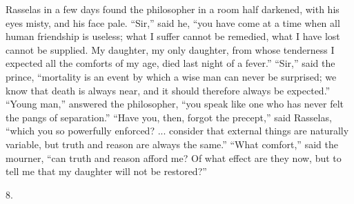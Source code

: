 Rasselas in a few days found the philosopher in a room half
darkened, with his eyes misty, and his face pale. ``Sir,''
said he, ``you have come at a time when all human friendship is
useless; what I suffer cannot be remedied, what I have lost cannot be
supplied. My daughter, my only daughter, from whose tenderness I
expected all the comforts of my age, died last night of a fever.''
``Sir,'' said the prince, ``mortality is an event by which
a wise man can never be surprised; we know that death is always near,
and it should therefore always be expected.'' ``Young
man,'' answered the philosopher, ``you speak like one who has
never felt the pangs of separation.'' ``Have you, then, forgot
the precept,'' said Rasselas, ``which you so powerfully
enforced? ... consider that external things are naturally variable,
but truth and reason are always the same.'' ``What
comfort,'' said the mourner, ``can truth and reason afford me?
Of what effect are they now, but to tell me that my daughter will not
be restored?''

8.

